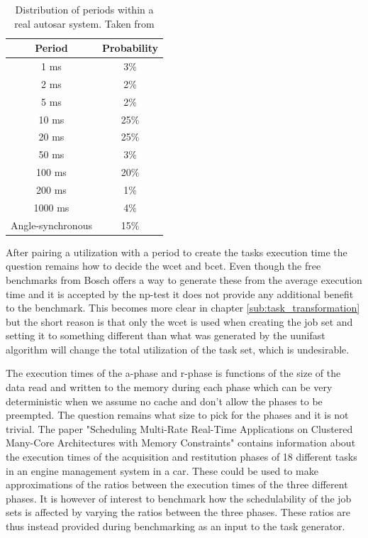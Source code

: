 \documentclass{kththesis}
\begin{document}
\begin{table}
    \centering
    \begin{tabular}{| c | c |} 
        \hline
        Period & Probability \\
        \hline
        1 ms & 3\% \\
        \hline
        2 ms & 2\% \\
        \hline
        5 ms & 2\% \\
        \hline
        10 ms & 25\% \\
        \hline
        20 ms & 25\% \\
        \hline
        50 ms & 3\% \\
        \hline
        100 ms & 20\% \\
        \hline
        200 ms & 1\% \\
        \hline
        1000 ms & 4\% \\
        \hline
        Angle-synchronous & 15\% \\
        \hline
    \end{tabular}
    \caption{Distribution of periods within a real \acrshort{autosar} system. Taken from \parencite{kramer_real_2015}}
    \label{tab:period_distribution}
\end{table}

After pairing a utilization with a period to create the tasks execution time the question remains
how to decide the \acrshort{wcet} and \acrshort{bcet}. Even though the free benchmarks from Bosch
offers a way to generate these from the average execution time and it is accepted by the
\acrshort{np}-test it does not provide any additional benefit to the benchmark. This becomes more
clear in chapter \ref{sub:task_transformation} but the short reason is that only the \acrshort{wcet}
is used when creating the job set and setting it to something different than what was generated by
the uunifast algorithm will change the total utilization of the task set, which is undesirable.

The execution times of the \acrshort{a}-phase and \acrshort{r}-phase is functions of the size of
the data read and written to the memory during each phase which can be very deterministic when we
assume no cache and don't allow the phases to be preempted. The question remains what size to pick
for the phases and it is not trivial. The paper "Scheduling Multi-Rate Real-Time Applications on
Clustered Many-Core Architectures with Memory Constraints"\parencite{becker_scheduling_2018} contains
information about the execution times of the acquisition and restitution phases of 18 different
tasks in an engine management system in a car. These could be used to make approximations of the
ratios between the execution times of the three different phases. It is however of interest to
benchmark how the schedulability of the job sets is affected by varying the ratios between the three
phases. These ratios are thus instead provided during benchmarking as an input to the task
generator.
\end{document}
